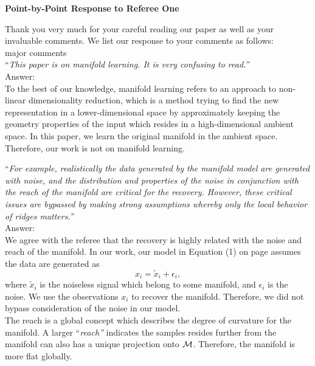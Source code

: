 \documentclass[12pt]{article}
\begin{document}

\begin{center}
{\bf \large Point-by-Point Response to Referee One}
\end{center}
Thank you very much for your careful reading our paper as well as your invaluable comments. We list our response to your comments as follows:\\ 
major comments\\

\noindent ``\textit {This paper is on manifold learning.  It is very confusing to read.''}\\
Answer:\\
To the best of our knowledge, manifold learning refers to an approach to non-linear dimensionality reduction, which is a method trying to find the new representation in a lower-dimensional space by approximately keeping the geometry properties of the input which resides in a high-dimensional ambient space. In this paper, we learn the original manifold in the ambient space. Therefore, our work is not on manifold learning.

\noindent ``\textit{For example, realistically the data generated by the manifold model are generated with noise, and the distribution and properties of the noise in conjunction with the reach of the manifold are critical for the recovery. However, these critical issues are bypassed by making strong assumptions whereby only the local behavior of ridges matters.''}\\
Answer:\\
We agree with the referee that the recovery is highly related with the noise and reach of the manifold. In our work, our model in Equation (1) on page assumes the data are generated as 
\begin{equation}\label{model}
x_i=\tilde{x}_i+\epsilon_i,
\end{equation}
where $\tilde{x}_i$ is the noiseless signal which belong to some manifold, and $\epsilon_i$ is the noise. We use the observations $x_i$ to recover the manifold. Therefore, we did not bypass consideration of the noise in our model.
\\
The reach is a global concept which describes the degree of curvature for the manifold. A larger {``\it reach''} indicates the samples resides further from the manifold can also has a unique projection onto $\cal M$. Therefore, the manifold is more flat globally.
\end{document}
